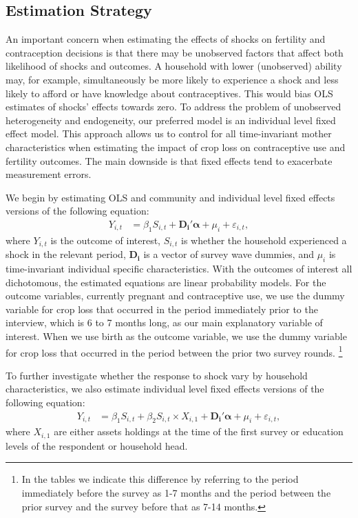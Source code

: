 \documentclass[letterpaper,12pt]{article}
\begin{document}
\subsection{Estimation Strategy}

An important concern when estimating
the effects of shocks on fertility and contraception decisions 
is that there may be unobserved factors that affect both likelihood of 
shocks and outcomes.
A household with lower (unobserved) ability may, for example, simultaneously be more 
likely to experience a shock and less likely to afford or have knowledge about 
contraceptives.
This would bias OLS estimates of shocks' effects towards zero.
To address the problem of unobserved heterogeneity and endogeneity, our
preferred model is an individual level fixed effect model. 
This approach allows us to control for all time-invariant mother characteristics when 
estimating the impact of crop loss on contraceptive use and fertility outcomes.
The main downside is that fixed effects tend to exacerbate measurement errors.

We begin by estimating OLS and community and individual level fixed effects 
versions of the following equation:
\begin{align}
Y_{i,t} &=  \beta_1 S_{i,t}  +\boldsymbol{D_{i}}'\boldsymbol{\alpha} 
+ \mu_i + \varepsilon_{i,t},   \label{eq:fixed_effects} 
\end{align}
where $Y_{i,t}$ is the outcome of interest,  
$S_{i,t}$ is whether the household experienced a shock in the relevant period,
$\boldsymbol{D_{i}}$ is a vector of survey wave dummies, 
and $\mu_i$ is time-invariant individual specific characteristics.
With the outcomes of interest all dichotomous, the estimated equations 
are linear probability models. 
For the outcome variables, currently pregnant and contraceptive use, we use 
the dummy variable for crop loss that occurred in the period immediately 
prior to the interview, which is 6 to 7 months long, as our main explanatory 
variable of interest. 
When we use birth as the outcome variable, 
we use the dummy variable for crop loss that occurred in the period between 
the prior two survey rounds.%
\footnote{
In the tables we indicate this difference by referring to the period 
immediately before the survey as 1-7 months and the period between the
prior survey and the survey before that as 7-14 months.
}

To further investigate whether the response to shock vary by household
characteristics, we also estimate individual level fixed effects versions 
of the following equation:
\begin{align}
Y_{i,t} &=  \beta_1 S_{i,t}  +  \beta_2 S_{i,t} \times X_{i,1} +
\boldsymbol{D_{i}}'\boldsymbol{\alpha} + \mu_i + \varepsilon_{i,t},   
\label{eq:fixed_effects} 
\end{align}
where $X_{i,1}$ are either assets holdings at the time of the first
survey or education levels of the respondent or household head.
\end{document}
